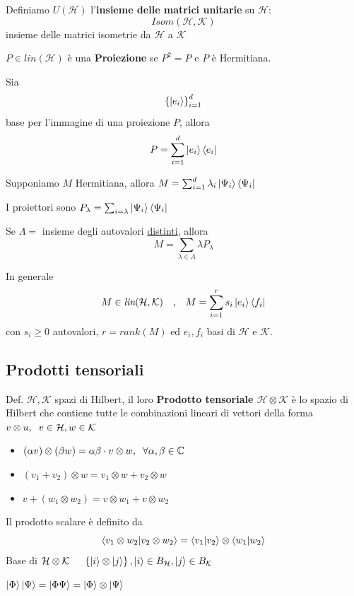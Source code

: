 \documentclass{report}
\begin{document}
Definiamo $U(\mathcal{H})$ l'\textbf{insieme delle matrici unitarie} su $\mathcal{H}$:
$$\textit{Isom}(\mathcal{H,K})$$ 
insieme delle matrici isometrie da $\mathcal{H}$ a $\mathcal{K}$

$P \in \textit{lin}(\mathcal{H})$ è una \textbf{Proiezione} se $P^2 = P$ e $P$ è Hermitiana.

Sia $$\left\{\ket{e_i} \right\}^d_{i=1}$$ base per l'immagine di una proiezione $P$, allora 
$$P = \sum^d_{i=1}\ket{e_i}\bra{e_i}$$

Supponiamo $M$ Hermitiana, allora $M = \sum^d_{i=1} \lambda_i \ket{\Psi_i}\bra{\Psi_i}$

\medskip
I proiettori sono $P_\lambda = \sum_{i=\lambda} \ket{\Psi_i}\bra{\Psi_i}$

\medskip
Se $\Lambda =$ insieme degli autovalori \underline{distinti}, allora $$M = \sum_{\lambda\in \Lambda} \lambda P_\lambda$$

In generale $$M\in\textit{lin}(\mathcal{H,K}) \quad \text{,} \quad M = \sum^r_{i=1} s_i\ket{e_i}\bra{f_i}$$
con $s_i\ge0$ autovalori, $r = \textit{rank}(M)$ ed $e_i,f_i$ basi di $\mathcal{H}$ e $\mathcal{K}$.

\newpage
\subsection{Prodotti tensoriali}
Def. $\mathcal{H,K}$ spazi di Hilbert, il loro \textbf{Prodotto tensoriale $\mathcal{H} \otimes \mathcal{K}$} è lo spazio di Hilbert che contiene tutte le combinazioni lineari di vettori della forma $v \otimes u, \hspace{0.2cm} v\in\mathcal{H}, w \in \mathcal{K}$
\begin{itemize}
    \item $(\alpha v) \otimes (\beta w) = \alpha\beta \cdot v\otimes w, \hspace{0.2cm} \forall\alpha,\beta \in \mathbb{C}$
    \item $(v_1 + v_2) \otimes w = v_1 \otimes w + v_2 \otimes w$
    \item $v + (w_1 \otimes w_2) = v \otimes w_1 + v \otimes w_2$
\end{itemize}
Il prodotto scalare è definito da
$$\braket{v_1 \otimes w_2 |v_2 \otimes w_2} = \braket{v_1|v_2} \otimes\braket{w_1|w_2}$$
Base di $\mathcal{H} \otimes \mathcal{K} \hspace{0.5cm} \left\{ \ket{i} \otimes\ket{j} \right\}, \ket{i}\in B_\mathcal{H}, \ket{j} \in B_\mathcal{K}$

\medskip
$\ket{\Phi}\ket{\Psi} = \ket{\Phi\Psi} = \ket{\Phi} \otimes \ket{\Psi}$
\end{document}
